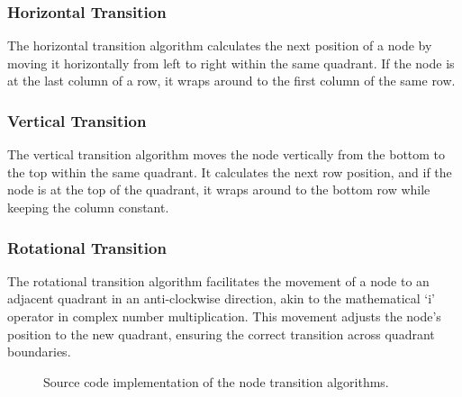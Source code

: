 \documentclass[12pt]{article}
\numberwithin{subsubsubsection}{subsubsection}
\begin{document}
\subsubsection{Horizontal Transition}

The horizontal transition algorithm calculates the next position of a node by moving it horizontally from left to right within the same quadrant. If the node is at the last column of a row, it wraps around to the first column of the same row. 

\subsubsection{Vertical Transition}

The vertical transition algorithm moves the node vertically from the bottom to the top within the same quadrant. It calculates the next row position, and if the node is at the top of the quadrant, it wraps around to the bottom row while keeping the column constant.

\subsubsection{Rotational Transition}
The rotational transition algorithm facilitates the movement of a node to an adjacent quadrant in an anti-clockwise direction, akin to the mathematical `i' operator in complex number multiplication. This movement adjusts the node's position to the new quadrant, ensuring the correct transition across quadrant boundaries.

\begin{figure}[H]
    \centering
    \caption{Source code implementation of the node transition algorithms.}
    \label{fig:node_transitions}
\end{figure}
\end{document}
